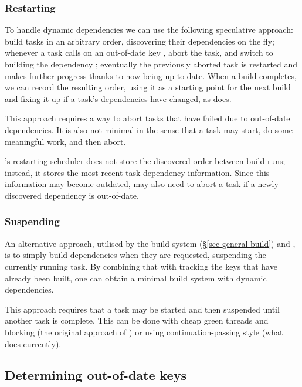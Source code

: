 \vspace{-2mm}
\subsubsection{Restarting}\label{sec-restarting}

To handle dynamic dependencies we can use the following speculative approach:
build tasks in an arbitrary order, discovering their dependencies on the fly;
whenever a task calls  on an out-of-date key , abort the task,
and switch to building the dependency ; eventually the previously
aborted task is restarted and makes further progress thanks to  now
being up to date. When a build completes, we can record the resulting order,
using it as a starting point for the next build and fixing it up if a task's
dependencies have changed, as \Excel does.

This approach requires a way to abort tasks that have failed due to out-of-date
dependencies. It is also not minimal in the sense that a task may start, do some
meaningful work, and then abort.

\Bazel's restarting scheduler does not store the discovered order between build
runs; instead, it stores the most recent task dependency information. Since this
information may become outdated, \Bazel may also need to abort a task if a
newly discovered dependency is out-of-date.

\vspace{-2mm}
\subsubsection{Suspending}\label{sec-suspending}

An alternative approach, utilised by the  build system
(\S\ref{sec-general-build}) and \Shake, is to simply build dependencies when
they are requested, suspending the currently running task. By combining that
with tracking the keys that have already been built, one can obtain a minimal
build system with dynamic dependencies.

This approach requires that a task may be started and then suspended until
another task is complete. This can be done with cheap green threads and blocking
(the original approach of \Shake) or using continuation-passing style (what
\Shake does currently).

\subsection{Determining out-of-date keys} \label{sec-out-of-date}

